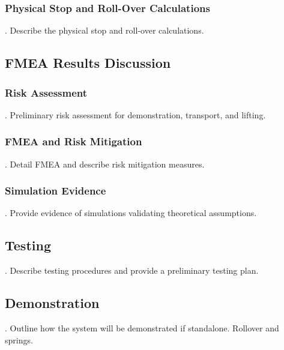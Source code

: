 \subsubsection{Physical Stop and Roll-Over Calculations}
.  Describe the physical stop and roll-over calculations.

\subsection{FMEA Results Discussion}
\subsubsection{Risk Assessment}
.  Preliminary risk assessment for demonstration, transport, and lifting.
\subsubsection{FMEA and Risk Mitigation}
.  Detail FMEA and describe risk mitigation measures.
\subsubsection{Simulation Evidence}
.  Provide evidence of simulations validating theoretical assumptions.

\subsection{Testing}
.  Describe testing procedures and provide a preliminary testing plan.

\subsection{Demonstration}
.  Outline how the system will be demonstrated if standalone. Rollover and springs.